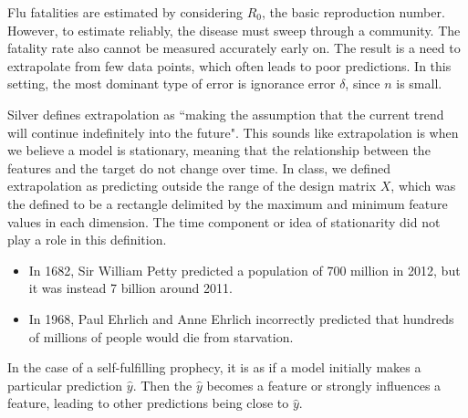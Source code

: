 \documentclass[12pt]{article}
\begin{document}
\begin{enumerate}


Flu fatalities are estimated by considering $R_0$, the basic reproduction number.
However, to estimate reliably, the disease must sweep through a community.
The fatality rate also cannot be measured accurately early on. The result is
a need to extrapolate from few data points, which often leads to poor predictions. In this setting,
the most dominant type of error is ignorance error $\delta$, since $n$ is small.


Silver defines extrapolation as ``making the assumption that the current trend will
continue indefinitely into the future". This sounds like extrapolation is when we
believe a model is stationary, meaning that the relationship between the features
and the target do not change over time. In class, we defined extrapolation as predicting
outside the range of the design matrix $X$, which was the defined to be a rectangle
delimited by the maximum and minimum feature values in each dimension. The time
component or idea of stationarity did not play a role in this definition.


\begin{itemize}
	\item In 1682, Sir William Petty predicted a population of 700 million in 2012,
	but it was instead 7 billion around 2011.
	\item In 1968, Paul Ehrlich and Anne Ehrlich incorrectly predicted that hundreds
	of millions of people would die from starvation.
\end{itemize}


In the case of a self-fulfilling prophecy, it is as if a model initially makes
a particular prediction $\hat{y}$. Then the $\hat{y}$ becomes a feature or
strongly influences a feature, leading to other predictions being close
to $\hat{y}$.


\end{enumerate}
\end{document}
